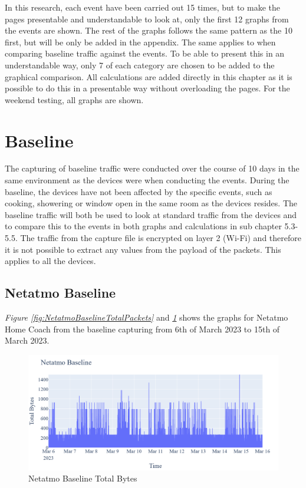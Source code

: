 In this research, each event have been carried out 15 times, but to make the pages presentable and understandable to look at, only the first 12 graphs from the events are shown. The rest of the graphs follows the same pattern as the 10 first, but will be only be added in the appendix. The same applies to when comparing baseline traffic against the events. To be able to present this in an understandable way, only 7 of each category are chosen to be added to the graphical comparison. All calculations are added directly in this chapter as it is possible to do this in a presentable way without overloading the pages. For the weekend testing, all graphs are shown. 

\section{Baseline}
The capturing of baseline traffic were conducted over the course of 10 days in the same environment as the devices were when conducting the events. During the baseline, the devices have not been affected by the specific events, such as cooking, showering or window open in the same room as the devices resides. The baseline traffic will both be used to look at standard traffic from the devices and to compare this to the events in both graphs and calculations in sub chapter 5.3-5.5. The traffic from the capture file is encrypted on layer 2 (Wi-Fi) and therefore it is not possible to extract any values from the payload of the packets. This applies to all the devices.  
\subsection{Netatmo Baseline}
\textit{Figure \ref{fig:NetatmoBaselineTotalPackets}} and \textit{\ref{fig:NetatmoBaselineTotalBytes}} shows the graphs for Netatmo Home Coach from the baseline capturing from 6th of March 2023 to 15th of March 2023. 
\begin{figure} [H]
    \centering
    \includegraphics[scale=0.3]{figures/Netatmo_Baseline_TotalBytes.png}
    \caption{Netatmo Baseline Total Bytes}
    \label{fig:NetatmoBaselineTotalBytes}
\end{figure}

